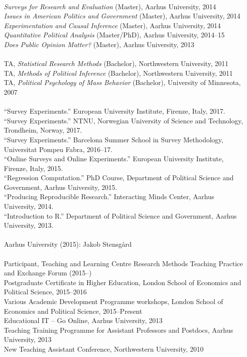 \documentclass[12pt]{article}
\newcommand{\topic}[1]{\pagebreak[3]\indent {\color{lg}{\footnotesize #1 }}\\}
\newcommand{\entry}[1]{\indent {\color{lg}\guillemotright}\hspace{2pt}#1\vspace{.25em}\\}
\begin{document}
\topic{Lecturing: Aarhus University}
	\entry{\textit{Surveys for Research and Evaluation} (Master), Aarhus University, 2014}
	\entry{\textit{Issues in American Politics and Government} (Master), Aarhus University, 2014}
	\entry{\textit{Experimentation and Causal Inference} (Master), Aarhus University, 2014}
	\entry{\textit{Quantitative Political Analysis} (Master/PhD), Aarhus University, 2014--15}
	\entry{\textit{Does Public Opinion Matter?} (Master), Aarhus University, 2013}

\topic{Class Teaching: Northwestern University}
	\entry{TA, \textit{Statistical Research Methods} (Bachelor), Northwestern University, 2011} %
	\entry{TA, \textit{Methods of Political Inference} (Bachelor), Northwestern University, 2011} %
	\entry{TA, \textit{Political Psychology of Mass Behavior} (Bachelor), University of Minnesota, 2007} %

\topic{Short courses}
	\entry{``Survey Experiments.'' European University Institute, Firenze, Italy, 2017.}
	\entry{``Survey Experiments.'' NTNU, Norwegian University of Science and Technology, Trondheim, Norway, 2017.}
	\entry{``Survey Experiments.'' Barcelona Summer School in Survey Methodology, Universitat Pompeu Fabra, 2016--17.}
	\entry{``Online Surveys and Online Experiments.'' European University Institute, Firenze, Italy, 2015.}
	\entry{``Regression Computation.'' PhD Course, Department of Political Science and Government, Aarhus University, 2015.}
	\entry{``Producing Reproducible Research.'' Interacting Minds Center, Aarhus University, 2014.}
	\entry{``Introduction to R.'' Department of Political Science and Government, Aarhus University, 2013.}

\topic{Master Thesis Supervision}
	\entry{Aarhus University (2015): Jakob Stensg{\aa}rd}

\topic{Pedagogical Training}
	\entry{Participant, Teaching and Learning Centre Research Methods Teaching Practice and Exchange Forum (2015--)}
	\entry{Postgraduate Certificate in Higher Education, London School of Economics and Political Science, 2015--2016}
	\entry{Various Academic Development Programme workshops, London School of Economics and Political Science, 2015--Present}
	\entry{Educational IT -- Go Online, Aarhus University, 2013}
	\entry{Teaching Training Programme for Assistant Professors and Postdocs, Aarhus University, 2013}
	\entry{New Teaching Assistant Conference, Northwestern University, 2010}
\end{document}
